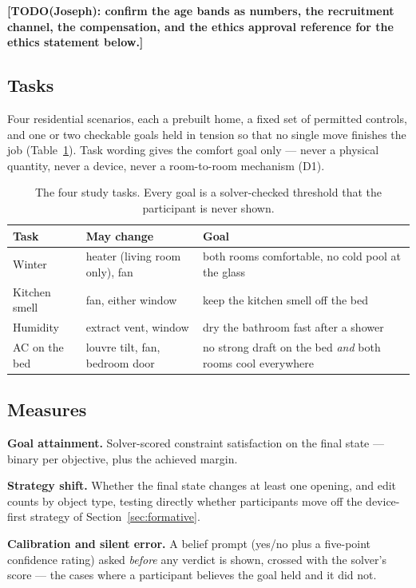 \documentclass[manuscript,review,anonymous]{acmart}
\begin{document}
\textbf{[TODO(Joseph): confirm the age bands as numbers, the recruitment
channel, the compensation, and the ethics approval reference for the ethics
statement below.]}

\subsection{Tasks}

Four residential scenarios, each a prebuilt home, a fixed set of permitted
controls, and one or two checkable goals held in tension so that no single move
finishes the job (Table~\ref{tab:tasks}). Task wording gives the comfort goal
only --- never a physical quantity, never a device, never a room-to-room
mechanism (D1).

\begin{table}[t]
  \caption{The four study tasks. Every goal is a solver-checked threshold that
    the participant is never shown.}
  \label{tab:tasks}
  \small
  \begin{tabular}{p{1.7cm}p{2.2cm}p{3.4cm}}
    \toprule
    Task & May change & Goal \\
    \midrule
    Winter & heater (living room only), fan & both rooms comfortable, no cold pool at the glass \\
    Kitchen smell & fan, either window & keep the kitchen smell off the bed \\
    Humidity & extract vent, window & dry the bathroom fast after a shower \\
    AC on the bed & louvre tilt, fan, bedroom door & no strong draft on the bed \emph{and} both rooms cool everywhere \\
    \bottomrule
  \end{tabular}
\end{table}

\subsection{Measures}

\textbf{Goal attainment.} Solver-scored constraint satisfaction on the final
state --- binary per objective, plus the achieved margin.

\textbf{Strategy shift.} Whether the final state changes at least one opening,
and edit counts by object type, testing directly whether participants move off
the device-first strategy of Section~\ref{sec:formative}.

\textbf{Calibration and silent error.} A belief prompt (yes/no plus a five-point
confidence rating) asked \emph{before} any verdict is shown, crossed with the
solver's score --- the cases where a participant believes the goal held and it
did not.
\end{document}

